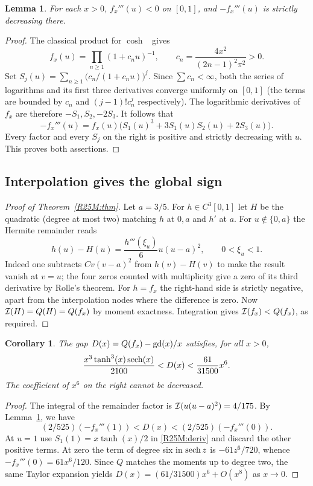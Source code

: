 \documentclass[11pt,a4paper]{article}
\newtheorem{SourceRcfMlemma}[SourceRcfMtheorem]{Lemma}
\newtheorem{SourceRcfMcorollary}[SourceRcfMtheorem]{Corollary}
\begin{document}
\begin{SourceRcfMlemma}\label{R25M:sign}
For each $x>0$, $f_x'''(u)<0$ on $[0,1]$, and $-f_x'''(u)$
is strictly decreasing there.
\end{SourceRcfMlemma}
\begin{proof}
The classical product for $\cosh$~\cite[(4.36.2)]{R25M:dlmf} gives
\[
 f_x(u)=\prod_{n\ge1}(1+c_nu)^{-1},\qquad
 c_n=\frac{4x^2}{(2n-1)^2\pi^2}>0.
\]
Set $S_j(u)=\sum_{n\ge1}\bigl(c_n/(1+c_nu)\bigr)^j$.
Since $\sum c_n<\infty$, both the series of logarithms and
its first three derivatives converge uniformly on $[0,1]$
(the terms are bounded by $c_n$ and $(j-1)!c_n^j$ respectively).
The logarithmic derivatives of $f_x$ are therefore $-S_1,S_2,-2S_3$.
It follows that
\begin{equation}
 -f_x'''(u)=f_x(u)\bigl(S_1(u)^3+3S_1(u)S_2(u)+2S_3(u)\bigr).
 \label{R25M:deriv}
\end{equation}
Every factor and every $S_j$ on the right is positive and strictly
decreasing with $u$. This proves both assertions.
\end{proof}

\subsection{Interpolation gives the global sign}
\begin{proof}[Proof of Theorem~\ref{R25M:thm}]
Let $a=3/5$. For $h\in C^3[0,1]$ let $H$ be the quadratic
(degree at most two) matching $h$ at $0,a$ and $h'$ at $a$.
For $u\notin\{0,a\}$ the Hermite remainder reads
\[
 h(u)-H(u)=\frac{h'''(\xi_u)}{6}u(u-a)^2,\qquad 0<\xi_u<1.
\]
Indeed one subtracts $C v(v-a)^2$ from $h(v)-H(v)$ to make
the result vanish at $v=u$; the four zeros counted with multiplicity
give a zero of its third derivative by Rolle's theorem.
For $h=f_x$ the right-hand side is strictly negative, apart
from the interpolation nodes where the difference is zero.
Now $\mathcal I(H)=Q(H)=Q(f_x)$ by moment exactness. Integration gives
$\mathcal I(f_x)<Q(f_x)$, as required.
\end{proof}

\begin{SourceRcfMcorollary}\label{R25M:error}
The gap $D(x)=Q(f_x)-\operatorname{gd}(x)/x$ satisfies, for all $x>0$,
\[
 \frac{x^3\tanh^3(x)\operatorname{sech}(x)}{2100}
 <D(x)<\frac{61}{31500}x^6.
\]
The coefficient of $x^6$ on the right cannot be decreased.
\end{SourceRcfMcorollary}
\begin{proof}
The integral of the remainder factor is $\mathcal I(u(u-a)^2)=4/175$.
By Lemma~\ref{R25M:sign}, we have
\[
 (2/525)(-f_x'''(1))<D(x)<(2/525)(-f_x'''(0)).
\]
At $u=1$ use
$S_1(1)=x\tanh(x)/2$ in \eqref{R25M:deriv} and discard the other
positive terms. At zero the term of degree six in $\operatorname{sech} z$ is
$-61z^6/720$, whence $-f_x'''(0)=61x^6/120$.
Since $Q$ matches the moments up to degree two,
the same Taylor expansion yields
$D(x)=(61/31500)x^6+O(x^8)$ as $x\to0$.
\end{proof}
\end{document}
